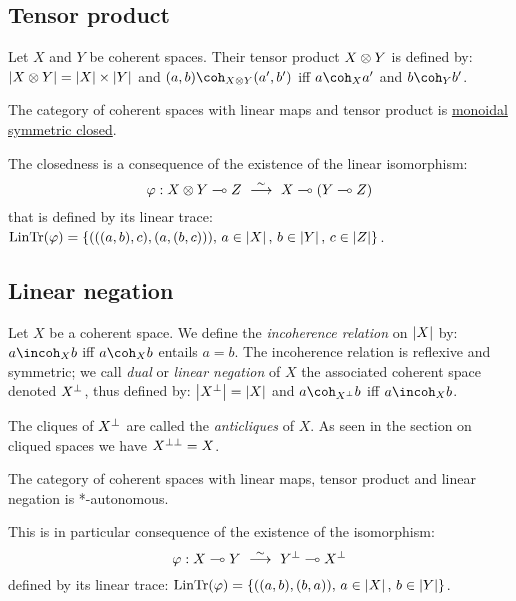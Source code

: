 \subsection{Tensor product}\label{tensor-product}

\begin{definition}
Let $X$ and $Y$ be coherent spaces. Their tensor product $X\otimes Y$ is defined by: $\left|X\otimes Y\right| = \left|X\right|\times\left|Y\right|$ and $(a,b)\coh_{X\tens Y}(a',b')$ iff $a\coh_X a'$ and $b\coh_Y b'$.
\end{definition}

\begin{theorem}
The category of coherent spaces with linear maps and tensor product is \hyperref[modeling-imll]{monoidal symmetric closed}.
\end{theorem}

The closedness is a consequence of the existence of the linear
isomorphism:
\begin{equation*}
\varphi:X\tens Y\limp Z\ \stackrel{\sim}{\longrightarrow}\ X\limp(Y\limp Z)
\end{equation*}
that is defined by its linear trace:
\(\mathrm{LinTr}(\varphi) = \{(((a, b), c), (a, (b, c))),\, a\in\left|X\right|,\, b\in \left|Y\right|,\, c\in\left|Z\right|\}\).

\subsection{Linear negation}\label{linear-negation}

\begin{definition}
Let $X$ be a coherent space. We define the \emph{incoherence relation} on $\left|X\right|$ by: $a\incoh_X b$ iff $a\coh_X b$ entails $a=b$. The incoherence relation is reflexive and symmetric; we call \emph{dual} or \emph{linear negation} of $X$ the associated coherent space denoted $X^\bot$, thus defined by: $\left|X^\bot\right| = \left|X\right|$ and $a\coh_{X\orth} b$ iff $a\incoh_X b$.
\end{definition}

The cliques of \(X^\bot\) are called the \emph{anticliques} of \(X\). As
seen in the section on cliqued spaces we have \(X^{\bot\bot}=X\).

\begin{theorem}
The category of coherent spaces with linear maps, tensor product and linear negation is *-autonomous.
\end{theorem}

This is in particular consequence of the existence of the isomorphism:
\begin{equation*}
\varphi:X\limp Y\ \stackrel{\sim}{\longrightarrow}\ Y\orth\limp X\orth
\end{equation*}
defined by its linear trace:
\(\mathrm{LinTr}(\varphi) = \{((a, b), (b, a)),\, a\in\left|X\right|,\, b\in\left|Y\right|\}\).

